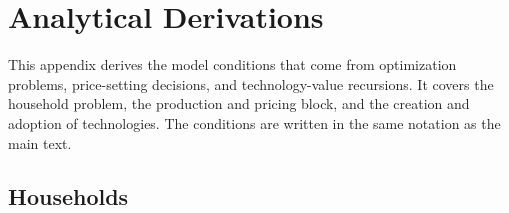 \documentclass[a4paper,11pt]{article}
\begin{document}
\clearpage
\appendix
{} %

\section{Analytical Derivations} \label{app:equilibrium}

This appendix derives the model conditions that come from optimization problems, price-setting decisions, and technology-value recursions.
It covers the household problem, the production and pricing block, and the creation and adoption of technologies.
The conditions are written in the same notation as the main text.

\subsection{Households}
\end{document}
